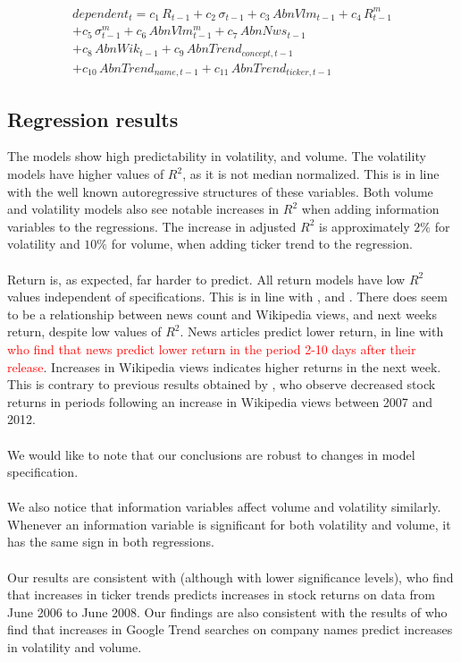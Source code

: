 \begin{equation}
\begin{split}
    dependent_t = c_1\,R_{t-1}+c_2\,\sigma_{t-1}+c_3\,AbnVlm_{t-1}+c_4\,R_{t-1}^m\\
    +c_5\,\sigma_{t-1}^m+c_6\,AbnVlm_{t-1}^m+c_7\,AbnNws_{t-1}\\
    +c_8\,AbnWik_{t-1}+c_9\,AbnTrend_{concept, t-1}\\
    +c_{10}\,AbnTrend_{name, t-1}+c_{11}\,AbnTrend_{ticker, t-1}
\end{split}
\end{equation}

\subsection{Regression results}
The models show high predictability in volatility, and volume. The volatility models have higher values of $R^2$, as it is not median normalized. This is in line with the well known autoregressive structures of these variables. Both volume and volatility models also see notable increases in $R^2$ when adding information variables to the regressions. The increase in adjusted $R^2$ is approximately $2\%$ for volatility and $10\%$ for volume, when adding ticker trend to the regression. 
\\\\
Return is, as expected, far harder to predict. All return models have low $R^2$ values independent of specifications. This is in line with \cite{engelberg}, \cite{neri} and \cite{bijl}. There does seem to be a relationship between news count and Wikipedia views, and next weeks return, despite low values of $R^2$. News articles predict lower return, in line with \textcolor{red}{\cite{aquadi} who find that news predict lower return in the period 2-10 days after their release}. Increases in Wikipedia views indicates higher returns in the next week. This is contrary to previous results obtained by \cite{moat}, who observe decreased stock returns in periods following an increase in Wikipedia views between 2007 and 2012.
\\\\
We would like to note that our conclusions are robust to changes in model specification.
\\\\
We also notice that information variables affect volume and volatility similarly.  Whenever an information variable is significant for both volatility and volume, it has the same sign in both regressions.
\\\\
Our results are consistent with \cite{engelberg}(although with lower significance levels), who find that increases in ticker trends predicts increases in stock returns on data from June 2006 to June 2008. Our findings are also consistent with the results of \cite{vlastakis} who find that increases in Google Trend searches on company names predict increases in volatility and volume. 

